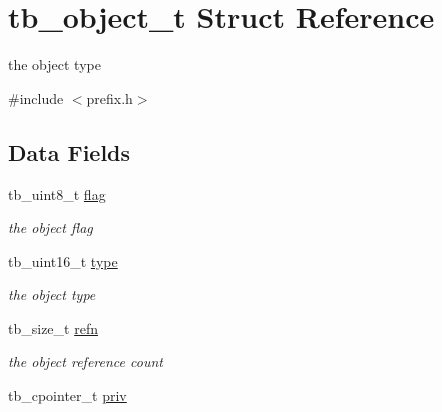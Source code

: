 \hypertarget{structtb__object__t}{\section{tb\-\_\-object\-\_\-t Struct Reference}
\label{structtb__object__t}
}


the object type  




{\ttfamily \#include $<$prefix.\-h$>$}

\subsection*{Data Fields}
\begin{DoxyCompactItemize}
\item 
\hypertarget{structtb__object__t_a04299db277b938804aa4cd38b7654b1a}{tb\-\_\-uint8\-\_\-t \hyperlink{structtb__object__t_a04299db277b938804aa4cd38b7654b1a}{flag}}\label{structtb__object__t_a04299db277b938804aa4cd38b7654b1a}

\begin{DoxyCompactList}\small\item\em the object flag \end{DoxyCompactList}\item 
\hypertarget{structtb__object__t_a7c6772ccef62f9563281541230d5114b}{tb\-\_\-uint16\-\_\-t \hyperlink{structtb__object__t_a7c6772ccef62f9563281541230d5114b}{type}}\label{structtb__object__t_a7c6772ccef62f9563281541230d5114b}

\begin{DoxyCompactList}\small\item\em the object type \end{DoxyCompactList}\item 
\hypertarget{structtb__object__t_a431348670c1afd858aece597c993a788}{tb\-\_\-size\-\_\-t \hyperlink{structtb__object__t_a431348670c1afd858aece597c993a788}{refn}}\label{structtb__object__t_a431348670c1afd858aece597c993a788}

\begin{DoxyCompactList}\small\item\em the object reference count \end{DoxyCompactList}\item 
\hypertarget{structtb__object__t_a55981d3f4264a4eaf0bd914ca1013693}{tb\-\_\-cpointer\-\_\-t \hyperlink{structtb__object__t_a55981d3f4264a4eaf0bd914ca1013693}{priv}}\label{structtb__object__t_a55981d3f4264a4eaf0bd914ca1013693}


\end{DoxyCompactItemize}
